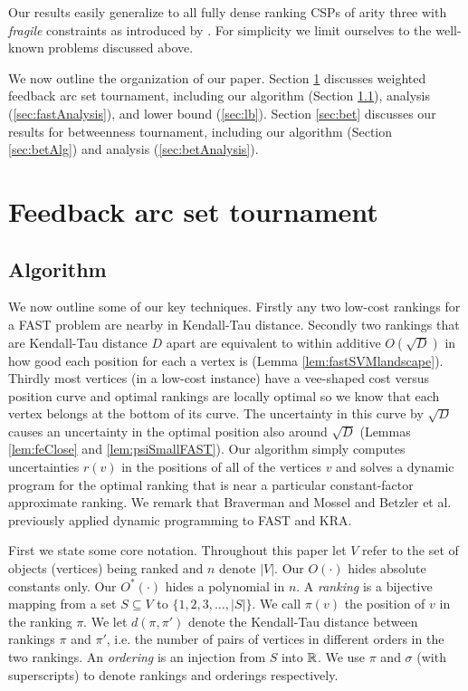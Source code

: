 \documentclass[envcountsame,oribibl]{llncs}
\newcommand{\set}[1]{\{#1\}}                        \newcommand{\setof}[2]{\{\,{#1}\::\:{#2}\,\}}        \newcommand{\groupFrac}[2]{\left(\frac{#1}{#2}\right)}
\newcommand{\fast}{\textsc{FAST}}
\begin{document}
Our results easily generalize to all fully dense ranking CSPs of arity three with \emph{fragile} constraints as introduced by \cite{Karpinski09betweenness}. For simplicity we limit ourselves to the well-known problems discussed above.

\medskip

We now outline the organization of our paper. Section \ref{sec:fast} discusses weighted feedback arc set tournament, including our algorithm (Section \ref{sec:fastAlg}), analysis (\ref{sec:fastAnalysis}), and lower bound (\ref{sec:lb}). Section \ref{sec:bet} discusses our results for betweenness tournament, including our algorithm (Section \ref{sec:betAlg}) and analysis (\ref{sec:betAnalysis}).

\section{Feedback arc set tournament} \label{sec:fast}

\subsection{Algorithm} \label{sec:fastAlg}

We now outline some of our key techniques. Firstly any two low-cost rankings for a FAST problem are nearby in Kendall-Tau distance. Secondly two rankings that are Kendall-Tau distance $D$ apart are equivalent to within additive $O(\sqrt{D})$ in how good each position for each a vertex is (Lemma \ref{lem:fastSVMlandscape}). Thirdly most vertices (in a low-cost instance) have a vee-shaped cost versus position curve and optimal rankings are locally optimal so we know that each vertex belongs at the bottom of its curve. The uncertainty in this curve by $\sqrt{D}$ causes an uncertainty in the optimal position also around $\sqrt{D}$ (Lemmas \ref{lem:feClose} and \ref{lem:psiSmallFAST}). Our algorithm simply computes uncertainties $r(v)$ in the positions of all of the vertices $v$ and solves a dynamic program for the optimal ranking that is near a particular constant-factor approximate ranking. We remark that Braverman and Mossel \cite{Braverman08} and Betzler et al.~\cite{Betzler08,Betzler09} previously applied dynamic programming to \fast{} and KRA.

First we state some core notation. Throughout this paper let $V$ refer to the set of objects (vertices) being ranked and $n$ denote $|V|$. Our $O(\cdot)$ hides absolute constants only. Our $O^*(\cdot)$ hides a polynomial in $n$. A \emph{ranking} is a bijective mapping from a set $S \subseteq V$ to $\set{1,2,3,\ldots,|S|}$. We call $\pi(v)$ the position of $v$ in the ranking $\pi$. We let $d(\pi,\pi')$ denote the Kendall-Tau distance between rankings $\pi$ and $\pi'$, i.e. the number of pairs of vertices in different orders in the two rankings.
An \emph{ordering} is an injection from $S$ into $\mathbb{R}$. We use $\pi$ and $\sigma$ (with superscripts) to denote rankings  and orderings respectively.
\end{document}
